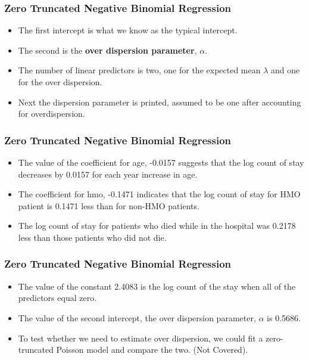 \documentclass[MASTER.tex]{subfiles}
\begin{document}
\begin{frame}
	\frametitle{Zero Truncated Negative Binomial Regression}
	\Large
	\begin{itemize}


\item The first intercept is what we know as the typical intercept. 
\item The second is the \textbf{over dispersion parameter}, $\alpha$.
\item The number of linear predictors is two, one for the expected mean $\lambda$ and one for the over dispersion.
\item Next the dispersion parameter is printed, assumed to be one after accounting for overdispersion.
\end{itemize}

\end{frame}
\begin{frame}
	\frametitle{Zero Truncated Negative Binomial Regression}
	\Large
\begin{itemize}
\item The value of the coefficient for age, -0.0157 suggests that the log count of stay decreases by 0.0157 for each year increase in age.
\item The coefficient for hmo, -0.1471 indicates that the log count of stay for HMO patient is 0.1471 less than for non-HMO patients.
\item The log count of stay for patients who died while in the hospital was 0.2178 less than those patients who did not die.
\end{itemize}

\end{frame}
\begin{frame}
		\frametitle{Zero Truncated Negative Binomial Regression}
	\Large
\begin{itemize}
	\item		
The value of the constant 2.4083 is the log count of the stay when all of the predictors equal zero.
\item The value of the second intercept, the over dispersion parameter, $\alpha$ is 0.5686.
\item To test whether we need to estimate over dispersion, we could fit a zero-truncated Poisson model and compare the two. (Not Covered).
\end{itemize}
\end{frame}
\end{document}
